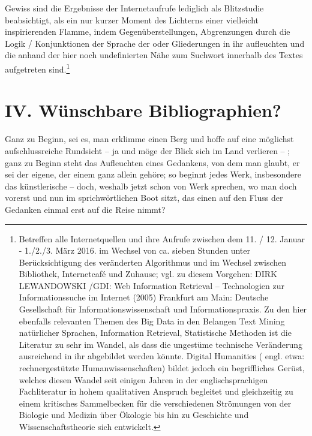 \documentclass[a4paper,
fontsize=11pt,
oneside,
numbers=noperiodatend,
parskip=half-,
bibliography=totoc,
final
]{scrartcl}
\begin{document}
Gewiss sind die Ergebnisse der Internetaufrufe lediglich als Blitzstudie
beabsichtigt, als ein nur kurzer Moment des Lichterns einer vielleicht
inspirierenden Flamme, indem Gegenüberstellungen, Abgrenzungen durch die
Logik / Konjunktionen der Sprache der oder Gliederungen in ihr
aufleuchten und die anhand der hier noch undefinierten Nähe zum Suchwort
innerhalb des Textes aufgetreten sind.\footnote{Betreffen alle
  Internetquellen und ihre Aufrufe zwischen dem 11. / 12. Januar -
  1./2./3. März 2016. im Wechsel von ca. sieben Stunden unter
  Berücksichtigung des veränderten Algorithmus und im Wechsel zwischen
  Bibliothek, Internetcafé und Zuhause; vgl. zu diesem Vorgehen: DIRK
  LEWANDOWSKI /GDI: Web Information Retrieval -- Technologien zur
  Informationssuche im Internet (2005) Frankfurt am Main: Deutsche
  Gesellschaft für Informationswissenschaft und Informationspraxis. Zu
  den hier ebenfalls relevanten Themen des Big Data in den Belangen Text
  Mining natürlicher Sprachen, Information Retrieval, Statistische
  Methoden ist die Literatur zu sehr im Wandel, als dass die ungestüme
  technische Veränderung ausreichend in ihr abgebildet werden könnte.
  Digital Humanities ( engl. etwa: rechnergestützte Humanwissenschaften)
  bildet jedoch ein begriffliches Gerüst, welches diesen Wandel seit
  einigen Jahren in der englischsprachigen Fachliteratur in hohem
  qualitativen Anspruch begleitet und gleichzeitig zu einem kritisches
  Sammelbecken für die verschiedenen Strömungen von der Biologie und
  Medizin über Ökologie bis hin zu Geschichte und Wissenschaftstheorie
  sich entwickelt.}

\section*{IV. Wünschbare
Bibliographien?}\label{iv.-wuxfcnschbare-bibliographien}

Ganz zu Beginn, sei es, man erklimme einen Berg und hoffe auf eine
möglichst aufschlussreiche Rundsicht -- ja und möge der Blick sich im
Land verlieren -- ; ganz zu Beginn steht das Aufleuchten eines
Gedankens, von dem man glaubt, er sei der eigene, der einem ganz allein
gehöre; so beginnt jedes Werk, insbesondere das künstlerische -- doch,
weshalb jetzt schon von Werk sprechen, wo man doch vorerst und nun im
sprichwörtlichen Boot sitzt, das einen auf den Fluss der Gedanken einmal
erst auf die Reise nimmt?
\end{document}
